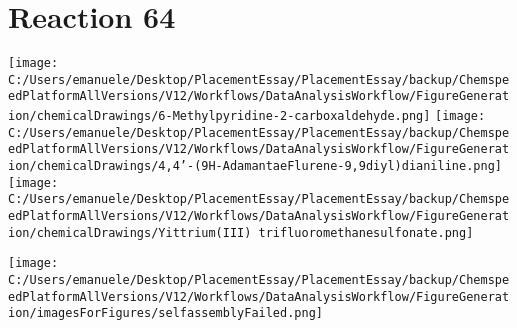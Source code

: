 \documentclass{article}%
\begin{document}
\section*{Reaction 64}%
%
\begin{scheme}[H]%
\begin{minipage}{0.5\textwidth}%
\texttt{[image: C:/Users/emanuele/Desktop/PlacementEssay/PlacementEssay/backup/ChemspeedPlatformAllVersions/V12/Workflows/DataAnalysisWorkflow/FigureGeneration/chemicalDrawings/6-Methylpyridine-2-carboxaldehyde.png]}%
\texttt{[image: C:/Users/emanuele/Desktop/PlacementEssay/PlacementEssay/backup/ChemspeedPlatformAllVersions/V12/Workflows/DataAnalysisWorkflow/FigureGeneration/chemicalDrawings/4,4'-(9H-AdamantaeFlurene-9,9diyl)dianiline.png]}%
\texttt{[image: C:/Users/emanuele/Desktop/PlacementEssay/PlacementEssay/backup/ChemspeedPlatformAllVersions/V12/Workflows/DataAnalysisWorkflow/FigureGeneration/chemicalDrawings/Yittrium(III) trifluoromethanesulfonate.png]}%
\end{minipage}%
\begin{minipage}{0.5\textwidth}%
\begin{center}%
\texttt{[image: C:/Users/emanuele/Desktop/PlacementEssay/PlacementEssay/backup/ChemspeedPlatformAllVersions/V12/Workflows/DataAnalysisWorkflow/FigureGeneration/imagesForFigures/selfassemblyFailed.png]}%
\end{center}%
\end{minipage}%
\caption{Self-assembly of components 8, 13, with Yittrium(III) in a 3.0:1.5:1.0 molar ratio in CH$_3$CN at 60\textdegree C for 40h. These are the reagents (starting materials) for reaction 64.}%
\end{scheme}%
\end{document}
